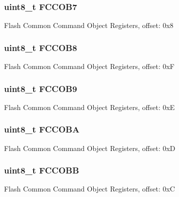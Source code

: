 \subsubsection[{F\+C\+C\+O\+B7}]{\setlength{\rightskip}{0pt plus 5cm}uint8\+\_\+t F\+C\+C\+O\+B7}\label{struct_f_t_f_a___mem_map_aed0c64fe289bde02ca6493b1be2f4154}
Flash Common Command Object Registers, offset\+: 0x8 \hypertarget{struct_f_t_f_a___mem_map_a098678952099a9d95ceb16bf591db8e4}{}
\subsubsection[{F\+C\+C\+O\+B8}]{\setlength{\rightskip}{0pt plus 5cm}uint8\+\_\+t F\+C\+C\+O\+B8}\label{struct_f_t_f_a___mem_map_a098678952099a9d95ceb16bf591db8e4}
Flash Common Command Object Registers, offset\+: 0x\+F \hypertarget{struct_f_t_f_a___mem_map_ad4b7a9c387599f74d604a12eab7b3f8d}{}
\subsubsection[{F\+C\+C\+O\+B9}]{\setlength{\rightskip}{0pt plus 5cm}uint8\+\_\+t F\+C\+C\+O\+B9}\label{struct_f_t_f_a___mem_map_ad4b7a9c387599f74d604a12eab7b3f8d}
Flash Common Command Object Registers, offset\+: 0x\+E \hypertarget{struct_f_t_f_a___mem_map_aee01b0413a1bb74026a460da212a6f6d}{}
\subsubsection[{F\+C\+C\+O\+B\+A}]{\setlength{\rightskip}{0pt plus 5cm}uint8\+\_\+t F\+C\+C\+O\+B\+A}\label{struct_f_t_f_a___mem_map_aee01b0413a1bb74026a460da212a6f6d}
Flash Common Command Object Registers, offset\+: 0x\+D \hypertarget{struct_f_t_f_a___mem_map_a48976ea549cc3a304a04666888b266a3}{}
\subsubsection[{F\+C\+C\+O\+B\+B}]{\setlength{\rightskip}{0pt plus 5cm}uint8\+\_\+t F\+C\+C\+O\+B\+B}\label{struct_f_t_f_a___mem_map_a48976ea549cc3a304a04666888b266a3}
Flash Common Command Object Registers, offset\+: 0x\+C \hypertarget{struct_f_t_f_a___mem_map_ab5c5e8faa06a25a28d3ff1e9baa83550}{}

